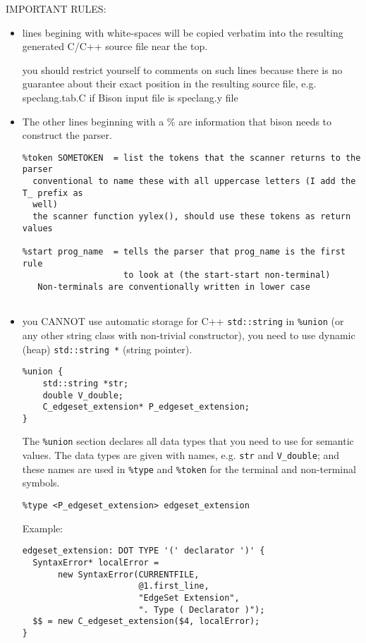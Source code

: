 IMPORTANT RULES:
\begin{itemize}
  \item lines begining with white-spaces will be copied verbatim into the
  resulting generated C/C++ source file near the top.
  
  you should restrict yourself to comments on such lines because there is no
  guarantee about their exact position in the resulting source file, e.g.
  speclang.tab.C if Bison input file is speclang.y file
  
  \item The other lines beginning with a \% are information that bison needs to
   construct the parser.
   
{\tiny
\begin{verbatim}
%token SOMETOKEN  = list the tokens that the scanner returns to the parser
  conventional to name these with all uppercase letters (I add the T_ prefix as
  well)
  the scanner function yylex(), should use these tokens as return values

%start prog_name  = tells the parser that prog_name is the first rule 
                    to look at (the start-start non-terminal)
   Non-terminals are conventionally written in lower case
   
\end{verbatim}   
}
   
   \item you CANNOT use  automatic storage for C++ \verb!std::string! in
   \verb!%union!  (or any other string class with non-trivial constructor), you
   need to use dynamic (heap)  \verb!std::string *! (string pointer).
\begin{verbatim}
%union {
    std::string *str;
    double V_double;
    C_edgeset_extension* P_edgeset_extension;
}
\end{verbatim}   

The \verb!%union! section declares all data types that you need to use for
semantic values. The data types are given with names, e.g. \verb!str! and
\verb!V_double!; and these names are used in \verb!%type! and
\verb!%token! for the terminal and non-terminal symbols.
\begin{verbatim}
%type <P_edgeset_extension> edgeset_extension
\end{verbatim}

Example:
\begin{verbatim}
edgeset_extension: DOT TYPE '(' declarator ')' {
  SyntaxError* localError = 
       new SyntaxError(CURRENTFILE,
                       @1.first_line,
                       "EdgeSet Extension",
                       ". Type ( Declarator )");
  $$ = new C_edgeset_extension($4, localError);
}
\end{verbatim}
 

\end{itemize}
